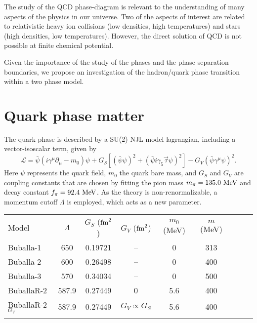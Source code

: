 \documentclass{ws-ijmpcs}
\begin{document}
The study of the QCD phase-diagram is relevant to the understanding of many aspects of the physics in our universe. Two of the aspects of interest are related to relativistic heavy ion collisions (low densities, high temperatures) and stars (high densities, low temperatures). However, the direct solution of QCD is not possible at finite chemical potential.

Given the importance of the study of the phases and the phase separation boundaries, we propose an investigation of the hadron/quark phase transition within a two phase model.

\section{Quark phase matter}

The quark phase is described by a SU(2) NJL model lagrangian, including a vector-isoscalar term, given by \cite{Buballa2005}
\begin{equation}\label{Eq:LagNJL-SU2-Bub}
	\mathcal{L} =\bar{\psi}(i\gamma^\mu\partial_\mu - m_0)\psi + G_S[(\bar{\psi}\psi)^2 + (\bar{\psi}i\gamma_5\vec{\tau}\psi)^2] - G_V(\bar{\psi}\gamma^\mu \psi)^2.
\end{equation}
%
Here $\psi$ represents the quark field, $m_0$ the quark bare mass, and $G_S$ and $G_V$ are coupling constants that are chosen by fitting the pion mass $m_\pi = 135.0~\rm{MeV}$ and decay constant $f_\pi = 92.4~\rm{MeV}$. As the theory is non-renormalizable, a momentum cutoff $\Lambda$ is employed, which acts as a new parameter.

\begin{table}[ph]
{\begin{tabular}{@{}lcccccccc@{}}\toprule
Model &  $\Lambda$ & $G_S$ ($\rm{fm}^2$) & $G_V$ ($\rm{fm}^2$) & $m_0$ (MeV) & $m$ (MeV) \\ \colrule
Buballa-1 & 650 & 0.19721 & -- & 0 & 313 \\
Buballa-2 & 600 & 0.26498 & -- & 0 & 400 \\
Buballa-3 & 570 & 0.34034 & -- & 0 & 500 \\
BuballaR-2 & 587.9 & 0.27449 & 0 & 5.6 & 400 \\
BuballaR-2$_{G_V}$ & 587.9 & 0.27449 & $G_V \propto G_S$ & 5.6 & 400\\
\botrule
\end{tabular} \label{Tab:Parametros_NJL}}
\end{table}
\end{document}

